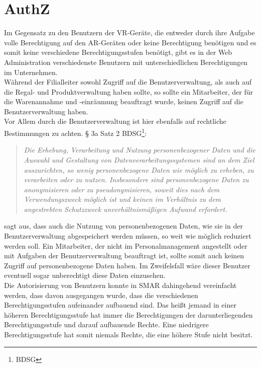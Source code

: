 \section{\acf{AuthZ}}
Im Gegensatz zu den Benutzern der \ac{VR}-Geräte, die entweder durch ihre Aufgabe volle Berechtigung auf den \ac{AR}-Geräten oder keine Berechtigung benötigen und es somit keine verschiedene Berechtigungsstufen benötigt, gibt es in der Web Administration verschiedenste Benutzern mit unterschiedlichen Berechtigungen im Unternehmen.\\
Während der Filialleiter sowohl Zugriff auf die Benutzerverwaltung, als auch auf die Regal- und Produktverwaltung haben sollte, so sollte ein Mitarbeiter, der für die Warenannahme und -einräumung beauftragt wurde, keinen Zugriff auf die Benutzerverwaltung haben.\\
Vor Allem durch die Benutzerverwaltung ist hier ebenfalls auf rechtliche Bestimmungen zu achten. § 3a Satz 2 \acs{BDSG}\footnote{\acf{BDSG}}:
\begin{quote}
	\glqq \textit{Die Erhebung, Verarbeitung und Nutzung personenbezogener Daten und die Auswahl und Gestaltung von Datenverarbeitungssystemen sind an dem Ziel auszurichten, so wenig personenbezogene Daten wie möglich zu erheben, zu verarbeiten oder zu nutzen. Insbesondere sind personenbezogene Daten zu anonymisieren oder zu pseudonymisieren, soweit dies nach dem Verwendungszweck möglich ist und keinen im Verhältnis zu dem angestrebten Schutzzweck unverhältnismäßigen Aufwand erfordert.}\grqq
\end{quote}
sagt aus, dass auch die Nutzung von personenbezogenen Daten, wie sie in der Benutzerverwaltung abgespeichert werden müssen, so weit wie möglich reduziert werden soll. Ein Mitarbeiter, der nicht im Personalmanagement angestellt oder mit Aufgaben der Benutzerverwaltung beauftragt ist, sollte somit auch keinen Zugriff auf personenbezogene Daten haben. Im Zweifelsfall wäre dieser Benutzer eventuell sogar unberechtigt diese Daten einzusehen.\\

Die Autorisierung von Benutzern konnte in \ac{SMAR} dahingehend vereinfacht werden, dass davon ausgegangen wurde, dass die verschiedenen Berechtigungsstufen aufeinander aufbauend sind. Das heißt jemand in einer höheren Berechtigungsstufe hat immer die Berechtigungen der darunterliegenden Berechtigungsstufe und darauf aufbauende Rechte. Eine niedrigere Berechtigungsstufe hat somit niemals Rechte, die eine höhere Stufe nicht besitzt.\\

